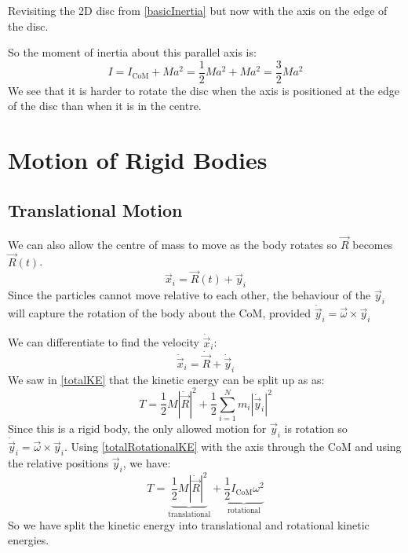 \documentclass[../main.tex]{subfiles}
\begin{document}
\begin{example}
  Revisiting the 2D disc from \cref{basicInertia} but now with the axis on the edge of the disc.
  \begin{center}
  \end{center}
  So the moment of inertia about this parallel axis is:
  \[
    I = I_{\text{CoM}} + Ma^2 = \frac{1}{2}Ma^2 + Ma^2 = \frac{3}{2}Ma^2
  \]
  We see that it is harder to rotate the disc when the axis is positioned at the edge of the disc than when it is in the centre.
\end{example}
\section{Motion of Rigid Bodies}
\subsection{Translational Motion}
We can also allow the centre of mass to move as the body rotates so $\vec{R}$ becomes $\vec{R}(t)$.
\[
  \vec{x}_i = \vec{R}(t) + \vec{y}_i
\]
Since the particles cannot move relative to each other, the behaviour of the $\vec{y}_i$ will capture the rotation of the body about the CoM, provided $\dot{\vec{y}}_i = \vec{\omega} \times \vec{y}_i$

We can differentiate to find the velocity $\dot{\vec{x}}_i$:
\[
  \dot{\vec{x}}_i = \dot{\vec{R}} + \dot{\vec{y}}_i
\]
We saw in \cref{totalKE} that the kinetic energy can be split up as as:
\[
  T = \frac{1}{2}M|\dot{\vec{R}}|^2 + \frac{1}{2} \sum_{i = 1}^{N} m_i |\dot{\vec{y}}_i|^2
\]
Since this is a rigid body, the only allowed motion for $\vec{y}_i$ is rotation so $\dot{\vec{y}}_i = \vec{\omega} \times \vec{y}_i$.
Using \cref{totalRotationalKE} with the axis through the CoM and using the relative positions $\vec{y}_i$, we have:
\begin{equation}
  T = \underbrace{\frac{1}{2}M|\dot{\vec{R}}|^2}_{\text{translational}} + \underbrace{\frac{1}{2} I_{\text{CoM}} \omega^2}_{\text{rotational}} \label{rigidKESplit}
\end{equation}
So we have split the kinetic energy into translational and rotational kinetic energies.
\end{document}
